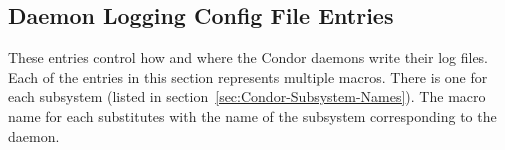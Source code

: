 \begin{description}
\end{description}


\subsection{\label{sec:Daemon-Logging-Config-File-Entries}
Daemon Logging Config File Entries}

These entries control how and where the Condor daemons write their log
files.  Each of the entries in this section represents multiple
macros. There is one for each subsystem (listed
in section~\ref{sec:Condor-Subsystem-Names}).
The macro name for each substitutes  with the name
of the subsystem corresponding to the daemon.
